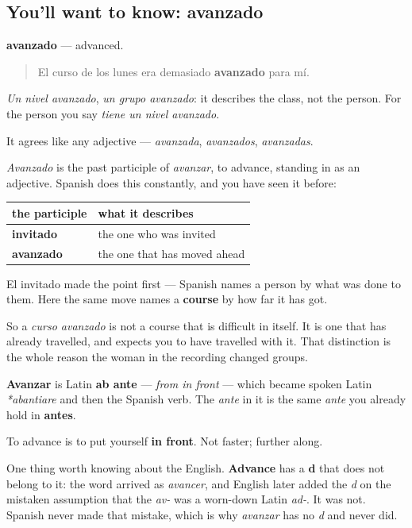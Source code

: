 \subsection*{You'll want to know: avanzado}
\textbf{avanzado} — advanced.

\begin{quote}
El curso de los lunes era demasiado \textbf{avanzado} para mí.
\end{quote}

\emph{Un nivel avanzado}, \emph{un grupo avanzado}: it describes the class, not the person. For the person you say \emph{tiene un nivel avanzado}.

It agrees like any adjective — \emph{avanzada}, \emph{avanzados}, \emph{avanzadas}.

\begin{grammarlens}[title={Grammar Lens: a participle doing an adjective's work}]
\emph{Avanzado} is the past participle of \emph{avanzar}, to advance, standing in as an adjective. Spanish does this constantly, and you have seen it before:

\noindent
\begin{tabularx}{\linewidth}{@{}>{\raggedright\arraybackslash}X>{\raggedright\arraybackslash}X@{}}
\toprule
\textbf{the participle} & \textbf{what it describes} \\
\midrule
\textbf{invitado} & the one who was invited \\
\textbf{avanzado} & the one that has moved ahead \\
\bottomrule
\end{tabularx}

El invitado made the point first — Spanish names a person by what was done to them. Here the same move names a \textbf{course} by how far it has got.

So a \emph{curso avanzado} is not a course that is difficult in itself. It is one that has already travelled, and expects you to have travelled with it. That distinction is the whole reason the woman in the recording changed groups.
\end{grammarlens}

\begin{cousinweb}
\textbf{Avanzar} is Latin \textbf{ab ante} — \emph{from in front} — which became spoken Latin \emph{*abantiare} and then the Spanish verb. The \emph{ante} in it is the same \emph{ante} you already hold in \textbf{antes}.

To advance is to put yourself \textbf{in front}. Not faster; further along.

One thing worth knowing about the English. \textbf{Advance} has a \textbf{d} that does not belong to it: the word arrived as \emph{avancer}, and English later added the \emph{d} on the mistaken assumption that the \emph{av-} was a worn-down Latin \emph{ad-}. It was not. Spanish never made that mistake, which is why \emph{avanzar} has no \emph{d} and never did.
\end{cousinweb}

